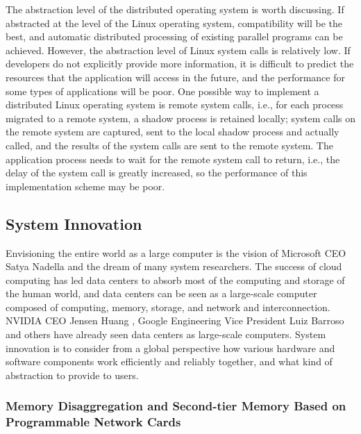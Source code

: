 The abstraction level of the distributed operating system is worth discussing. If abstracted at the level of the Linux operating system, compatibility will be the best, and automatic distributed processing of existing parallel programs can be achieved. However, the abstraction level of Linux system calls is relatively low. If developers do not explicitly provide more information, it is difficult to predict the resources that the application will access in the future, and the performance for some types of applications will be poor. One possible way to implement a distributed Linux operating system is remote system calls, i.e., for each process migrated to a remote system, a shadow process is retained locally; system calls on the remote system are captured, sent to the local shadow process and actually called, and the results of the system calls are sent to the remote system. The application process needs to wait for the remote system call to return, i.e., the delay of the system call is greatly increased, so the performance of this implementation scheme may be poor.

\subsection{System Innovation}
\label{future:system}

Envisioning the entire world as a large computer is the vision of Microsoft CEO Satya Nadella and the dream of many system researchers. The success of cloud computing has led data centers to absorb most of the computing and storage of the human world, and data centers can be seen as a large-scale computer composed of computing, memory, storage, and network and interconnection. NVIDIA CEO Jensen Huang \cite{nvidia-datacenter}, Google Engineering Vice President Luiz Barroso \cite{barroso2018datacenter} and others have already seen data centers as large-scale computers. System innovation is to consider from a global perspective how various hardware and software components work efficiently and reliably together, and what kind of abstraction to provide to users.

\subsubsection{Memory Disaggregation and Second-tier Memory Based on Programmable Network Cards}
\label{future:second-tier-memory}

